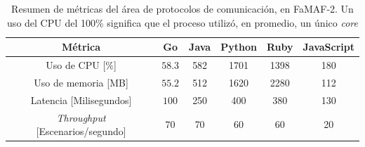 \documentclass[11pt]{article}
\newcommand{\english}[1]{\textit{#1}}
\begin{document}
\begin{table}[H]
\centering
\begin{tabular}{|c|c|c|c|c|c|}
\hline
Métrica       & Go   & Java & Python & Ruby & JavaScript \\ \hline
Uso de CPU [\%]         & $58.3$ & 582  & 1701   & 1398 & 180        \\ \hline
Uso de memoria [MB]   & $55.2$ & 512  & 1620   & 2280 & 112        \\ \hline
Latencia [Milisegundos]   & $100$  & 250  & 400    & 380  & 130        \\ \hline
\english{Throughput} [Escenarios/segundo] & $70$   & 70   & 60     & 60   & 20         \\ \hline
\end{tabular}
\caption{Resumen de métricas del área de protocolos de comunicación, en FaMAF-2. Un uso del CPU del 100\% significa que el proceso utilizó, en promedio, un único \english{core} }
\label{tab:http:famaf_1}
\end{table}
\end{document}
